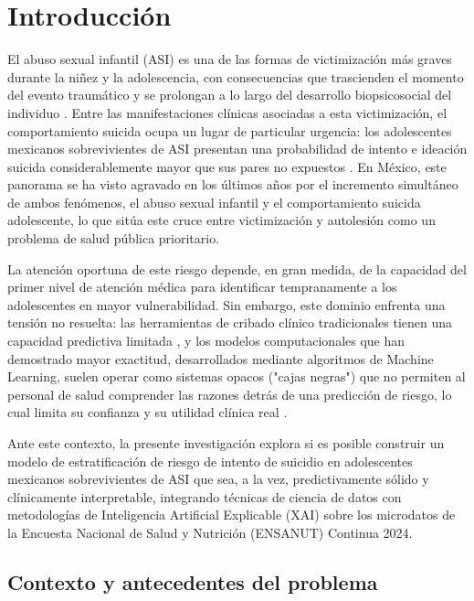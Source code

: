 \chapter{Introducción}
\label{cap:introduccion}

El abuso sexual infantil (ASI) es una de las formas de victimización más graves durante la niñez y la adolescencia, con consecuencias que trascienden el momento del evento traumático y se prolongan a lo largo del desarrollo biopsicosocial del individuo \cite{current_barth_2013}. Entre las manifestaciones clínicas asociadas a esta victimización, el comportamiento suicida ocupa un lugar de particular urgencia: los adolescentes mexicanos sobrevivientes de ASI presentan una probabilidad de intento e ideación suicida considerablemente mayor que sus pares no expuestos \cite{abuso_valdezsantiago_2020}. En México, este panorama se ha visto agravado en los últimos años por el incremento simultáneo de ambos fenómenos, el abuso sexual infantil y el comportamiento suicida adolescente, lo que sitúa este cruce entre victimización y autolesión como un problema de salud pública prioritario.

La atención oportuna de este riesgo depende, en gran medida, de la capacidad del primer nivel de atención médica para identificar tempranamente a los adolescentes en mayor vulnerabilidad. Sin embargo, este dominio enfrenta una tensión no resuelta: las herramientas de cribado clínico tradicionales tienen una capacidad predictiva limitada \cite{linthicumMachineLearningSuicide2019}, y los modelos computacionales que han demostrado mayor exactitud, desarrollados mediante algoritmos de Machine Learning, suelen operar como sistemas opacos ("cajas negras") que no permiten al personal de salud comprender las razones detrás de una predicción de riesgo, lo cual limita su confianza y su utilidad clínica real \cite{tangAnalysisEvaluationExplainable2024}.

Ante este contexto, la presente investigación explora si es posible construir un modelo de estratificación de riesgo de intento de suicidio en adolescentes mexicanos sobrevivientes de ASI que sea, a la vez, predictivamente sólido y clínicamente interpretable, integrando técnicas de ciencia de datos con metodologías de Inteligencia Artificial Explicable (XAI) sobre los microdatos de la Encuesta Nacional de Salud y Nutrición (ENSANUT) Continua 2024.

\section{Contexto y antecedentes del problema}

